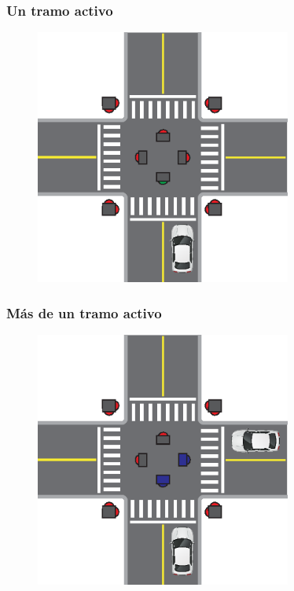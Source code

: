 \begin{frame}
\frametitle{Un tramo activo}
\begin{figure}[htbp]
	\centering
	\includegraphics[width=0.750\textwidth]{diagramas/un-activo.eps}
\end{figure}
\end{frame}

\begin{frame}
\frametitle{Más de un tramo activo}
\begin{figure}[htbp]
	\centering
	\includegraphics[width=0.750\textwidth]{diagramas/dos-activos.eps}
\end{figure}
\end{frame}

